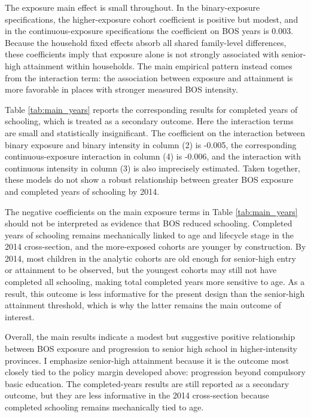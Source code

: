 \documentclass[a4paper, 12pt]{article}
\begin{document}
\begin{doublespacing}
The exposure main effect is small throughout. In the binary-exposure specifications, the higher-exposure cohort coefficient is positive but modest, and in the continuous-exposure specifications the coefficient on BOS years is 0.003. Because the household fixed effects absorb all shared family-level differences, these coefficients imply that exposure alone is not strongly associated with senior-high attainment within households. The main empirical pattern instead comes from the interaction term: the association between exposure and attainment is more favorable in places with stronger measured BOS intensity.
\clearpage
\begin{landscape}
    
\end{landscape}
\clearpage

Table \ref{tab:main_years} reports the corresponding results for completed years of schooling, which is treated as a secondary outcome. Here the interaction terms are small and statistically insignificant. The coefficient on the interaction between binary exposure and binary intensity in column (2) is -0.005, the corresponding continuous-exposure interaction in column (4) is -0.006, and the interaction with continuous intensity in column (3) is also imprecisely estimated. Taken together, these models do not show a robust relationship between greater BOS exposure and completed years of schooling by 2014.

The negative coefficients on the main exposure terms in Table \ref{tab:main_years} should not be interpreted as evidence that BOS reduced schooling. Completed years of schooling remains mechanically linked to age and lifecycle stage in the 2014 cross-section, and the more-exposed cohorts are younger by construction. By 2014, most children in the analytic cohorts are old enough for senior-high entry or attainment to be observed, but the youngest cohorts may still not have completed all schooling, making total completed years more sensitive to age. As a result, this outcome is less informative for the present design than the senior-high attainment threshold, which is why the latter remains the main outcome of interest.

Overall, the main results indicate a modest but suggestive positive relationship between BOS exposure and progression to senior high school in higher-intensity provinces. I emphasize senior-high attainment because it is the outcome most closely tied to the policy margin developed above: progression beyond compulsory basic education. The completed-years results are still reported as a secondary outcome, but they are less informative in the 2014 cross-section because completed schooling remains mechanically tied to age.


\end{doublespacing}
\end{document}

